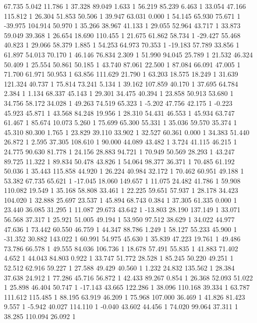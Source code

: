 	67.735 5.042 11.786 1
	37.328 89.049 1.633 1
	56.219 85.239 6.463 1
	33.054 47.166 115.812 1
	26.304 51.853 50.506 1
	39.947 63.031 0.000 1
	54.145 65.930 75.671 1
	-39.975 104.914 50.970 1
	35.266 38.967 41.133 1
	29.055 52.964 43.717 1
	33.873 59.049 39.368 1
	26.654 18.690 110.455 1
	21.675 61.862 58.734 1
	-29.427 55.468 40.823 1
	29.066 58.379 1.885 1
	54.253 64.973 70.353 1
	-19.183 57.789 33.856 1
	61.897 54.013 70.170 1
	46.146 76.834 2.309 1
	51.990 94.045 25.789 1
	21.532 46.324 50.409 1
	25.554 50.861 50.185 1
	43.740 87.061 22.500 1
	87.084 66.091 47.005 1
	71.700 61.971 50.953 1
	63.856 111.629 21.790 1
	63.203 18.575 18.249 1
	31.639 121.324 40.737 1
	75.814 73.241 5.134 1
	39.162 107.859 40.170 1
	37.695 64.784 2.384 1
	1.134 68.337 45.143 1
	29.301 34.475 40.394 1
	23.858 50.913 53.680 1
	34.756 58.172 34.028 1
	49.263 74.519 65.323 1
	-5.202 47.756 42.175 1
	-0.223 45.923 45.871 1
	43.568 84.248 19.956 1
	28.310 54.431 46.553 1
	45.934 63.747 61.467 1
	85.674 10.073 5.260 1
	75.699 65.300 55.331 1
	35.036 59.570 35.374 1
	45.310 80.300 1.765 1
	23.829 39.110 33.902 1
	32.527 60.361 0.000 1
	34.383 51.440 26.872 1
	2.595 37.305 108.610 1
	90.000 44.089 43.482 1
	3.724 41.115 46.215 1
	24.775 90.630 81.778 1
	24.156 28.883 94.721 1
	70.949 50.569 28.293 1
	43.247 89.725 11.322 1
	89.834 50.478 43.826 1
	54.064 98.377 36.371 1
	70.485 61.192 50.036 1
	35.443 115.858 44.920 1
	26.224 40.984 32.172 1
	70.462 60.951 49.188 1
	53.382 67.735 65.621 1
	-17.045 18.060 149.657 1
	11.075 24.482 41.786 1
	59.908 110.082 19.549 1
	35.168 58.808 33.461 1
	22.225 59.651 57.937 1
	28.178 34.423 104.020 1
	32.888 25.697 23.537 1
	45.894 68.743 0.384 1
	37.305 61.335 0.000 1
	23.440 36.085 31.295 1
	11.087 29.673 43.642 1
	-13.803 28.190 137.149 1
	33.071 56.568 37.317 1
	25.921 51.005 49.194 1
	53.950 97.512 38.629 1
	34.022 44.977 47.636 1
	73.442 60.550 46.759 1
	44.347 88.786 1.249 1
	58.127 55.233 45.900 1
	-31.352 30.882 143.022 1
	60.991 54.975 45.630 1
	35.839 47.223 19.761 1
	49.486 73.786 66.578 1
	49.555 84.036 106.736 1
	18.678 57.491 55.835 1
	41.883 71.402 4.652 1
	44.043 84.803 0.922 1
	33.747 51.772 28.528 1
	85.245 50.220 49.251 1
	52.512 62.916 59.227 1
	27.588 49.429 40.560 1
	1.232 24.832 135.562 1
	28.384 37.638 24.912 1
	77.286 45.716 56.872 1
	42.433 89.267 0.854 1
	26.368 52.093 51.022 1
	25.898 46.404 50.747 1
	-17.143 43.665 122.286 1
	38.096 110.168 39.334 1
	63.787 111.612 115.485 1
	88.195 63.919 46.209 1
	75.968 107.000 36.469 1
	41.826 81.423 9.557 1
	-5.942 40.027 114.110 1
	-0.040 43.602 44.456 1
	74.020 99.064 37.311 1
	38.285 110.094 26.092 1
